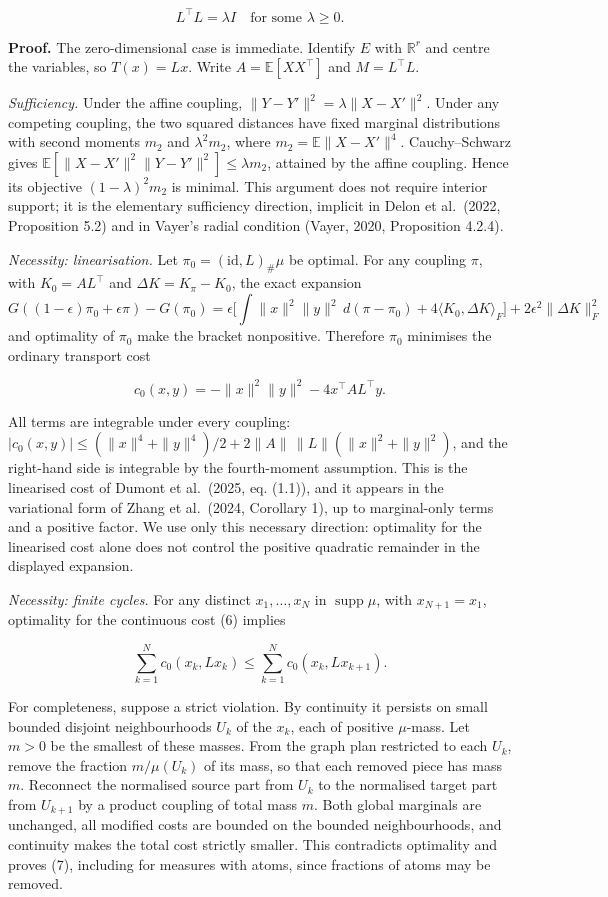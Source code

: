\documentclass[
  british,
  11pt,
  a4paper,
]{article}
\begin{document}
\[
L^\top L=\lambda I\quad\text{for some }\lambda\geq0.              \tag{5}
\]

\textbf{Proof.} The zero-dimensional case is immediate. Identify \(E\)
with \(\mathbb R^r\) and centre the variables, so \(T(x)=Lx\). Write
\(A=\mathbb E[XX^\top]\) and \(M=L^\top L\).

\emph{Sufficiency.} Under the affine coupling,
\(\|Y-Y'\|^2=\lambda\|X-X'\|^2\). Under any competing coupling, the two
squared distances have fixed marginal distributions with second moments
\(m_2\) and \(\lambda^2m_2\), where \(m_2=\mathbb E\|X-X'\|^4\).
Cauchy--Schwarz gives
\(\mathbb E[\|X-X'\|^2\|Y-Y'\|^2]\leq\lambda m_2\), attained by the
affine coupling. Hence its objective \((1-\lambda)^2m_2\) is minimal.
This argument does not require interior support; it is the elementary
sufficiency direction, implicit in Delon et al.~(2022, Proposition 5.2)
and in Vayer's radial condition (Vayer, 2020, Proposition 4.2.4).

\emph{Necessity: linearisation.} Let \(\pi_0=(\mathrm{id},L)_\#\mu\) be
optimal. For any coupling \(\pi\), with \(K_0=AL^\top\) and
\(\Delta K=K_\pi-K_0\), the exact expansion \[
G((1-\epsilon)\pi_0+\epsilon\pi)-G(\pi_0)
=\epsilon\Big[\textstyle\int\|x\|^2\|y\|^2\,d(\pi-\pi_0)+4\langle K_0,\Delta K\rangle_F\Big]+2\epsilon^2\|\Delta K\|_F^2
\] and optimality of \(\pi_0\) make the bracket nonpositive. Therefore
\(\pi_0\) minimises the ordinary transport cost

\[
c_0(x,y)=-\|x\|^2\|y\|^2-4x^\top A L^\top y.                    \tag{6}
\]

All terms are integrable under every coupling:
\(|c_0(x,y)|\leq(\|x\|^4+\|y\|^4)/2+2\|A\|\,\|L\|(\|x\|^2+\|y\|^2)\),
and the right-hand side is integrable by the fourth-moment assumption.
This is the linearised cost of Dumont et al.~(2025, eq. (1.1)), and it
appears in the variational form of Zhang et al.~(2024, Corollary 1), up
to marginal-only terms and a positive factor. We use only this necessary
direction: optimality for the linearised cost alone does not control the
positive quadratic remainder in the displayed expansion.

\emph{Necessity: finite cycles.} For any distinct \(x_1,\ldots,x_N\) in
\(\operatorname{supp}\mu\), with \(x_{N+1}=x_1\), optimality for the
continuous cost (6) implies

\[
\sum_{k=1}^N c_0(x_k,Lx_k)
\leq\sum_{k=1}^N c_0(x_k,Lx_{k+1}).                              \tag{7}
\]

For completeness, suppose a strict violation. By continuity it persists
on small bounded disjoint neighbourhoods \(U_k\) of the \(x_k\), each of
positive \(\mu\)-mass. Let \(m>0\) be the smallest of these masses. From
the graph plan restricted to each \(U_k\), remove the fraction
\(m/\mu(U_k)\) of its mass, so that each removed piece has mass \(m\).
Reconnect the normalised source part from \(U_k\) to the normalised
target part from \(U_{k+1}\) by a product coupling of total mass \(m\).
Both global marginals are unchanged, all modified costs are bounded on
the bounded neighbourhoods, and continuity makes the total cost strictly
smaller. This contradicts optimality and proves (7), including for
measures with atoms, since fractions of atoms may be removed.
\end{document}

